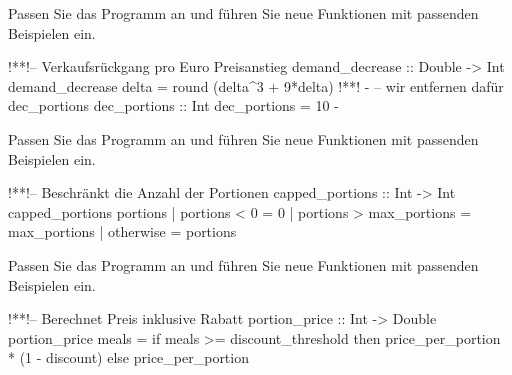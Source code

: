 \addtocounter{exercise}{-1}\addtocounter{solve}{-1}%
\begin{frame}\onslide<+->%
    \begin{exercise}[c)]
        Passen Sie das Programm an und führen Sie neue Funktionen mit passenden Beispielen ein.
    \end{exercise}
    \begin{solve}
    \begin{plainhaskell}
!*\onslide<+->*!-- Verkaufsrückgang pro Euro Preisanstieg
demand_decrease :: Double -> Int
demand_decrease delta = round (delta^3 + 9*delta)
!*\onslide<+->*!
{-
-- wir entfernen dafür dec_portions
dec_portions :: Int
dec_portions = 10
-}
    \end{plainhaskell}
    \end{solve}
\end{frame}
\addtocounter{exercise}{-1}\addtocounter{solve}{-1}%
\begin{frame}\onslide<+->%
    \begin{exercise}[c)]
        Passen Sie das Programm an und führen Sie neue Funktionen mit passenden Beispielen ein.
    \end{exercise}
    \begin{solve}
    \begin{plainhaskell}
!*\onslide<+->*!-- Beschränkt die Anzahl der Portionen
capped_portions :: Int -> Int
capped_portions portions
    | portions < 0            = 0
    | portions > max_portions = max_portions
    | otherwise               = portions
    \end{plainhaskell}
    \end{solve}
\end{frame}
\addtocounter{exercise}{-1}\addtocounter{solve}{-1}%
\begin{frame}\onslide<+->%
    \begin{exercise}[c)]
        Passen Sie das Programm an und führen Sie neue Funktionen mit passenden Beispielen ein.
    \end{exercise}
    \begin{solve}
    \begin{plainhaskell}
!*\onslide<+->*!-- Berechnet Preis inklusive Rabatt
portion_price :: Int -> Double
portion_price meals =
    if meals >= discount_threshold
    then price_per_portion * (1 - discount)
    else price_per_portion
    \end{plainhaskell}
    \end{solve}
\end{frame}

